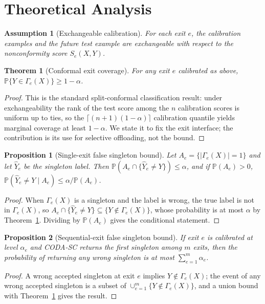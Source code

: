 \documentclass[11pt]{article}
\newtheorem{theorem}{Theorem}
\newtheorem{proposition}{Proposition}
\newtheorem{assumption}{Assumption}
\begin{document}
\section{Theoretical Analysis}

\begin{assumption}[Exchangeable calibration]
For each exit $e$, the calibration examples and the future test example are
exchangeable with respect to the nonconformity score $S_e(X,Y)$.
\end{assumption}

\begin{theorem}[Conformal exit coverage]
\label{thm:cov}
For any exit $e$ calibrated as above, $\mathbb{P}\{Y \in \Gamma_e(X)\} \geq 1-\alpha$.
\end{theorem}
\begin{proof}
This is the standard split-conformal classification result: under
exchangeability the rank of the test score among the $n$ calibration scores is
uniform up to ties, so the $\lceil(n+1)(1-\alpha)\rceil$ calibration quantile
yields marginal coverage at least $1-\alpha$. We state it to fix the exit
interface; the contribution is its use for selective offloading, not the bound.
\end{proof}

\begin{proposition}[Single-exit false singleton bound]
\label{prop:single}
Let $A_e=\{|\Gamma_e(X)|=1\}$ and let $\hat{Y}_e$ be the singleton label. Then
$\mathbb{P}(A_e \cap \{\hat{Y}_e \neq Y\}) \leq \alpha$, and if
$\mathbb{P}(A_e)>0$, $\mathbb{P}(\hat{Y}_e\neq Y \mid A_e) \leq \alpha/\mathbb{P}(A_e)$.
\end{proposition}
\begin{proof}
When $\Gamma_e(X)$ is a singleton and the label is wrong, the true label is not in
$\Gamma_e(X)$, so $A_e \cap \{\hat{Y}_e \neq Y\}\subseteq \{Y\notin\Gamma_e(X)\}$,
whose probability is at most $\alpha$ by Theorem~\ref{thm:cov}. Dividing by
$\mathbb{P}(A_e)$ gives the conditional statement.
\end{proof}

\begin{proposition}[Sequential-exit false singleton bound]
\label{prop:seq}
If exit $e$ is calibrated at level $\alpha_e$ and CODA-SC returns the first
singleton among $m$ exits, then the probability of returning any wrong singleton
is at most $\sum_{e=1}^{m}\alpha_e$.
\end{proposition}
\begin{proof}
A wrong accepted singleton at exit $e$ implies $Y\notin\Gamma_e(X)$; the event of
any wrong accepted singleton is a subset of $\cup_{e=1}^{m}\{Y\notin\Gamma_e(X)\}$,
and a union bound with Theorem~\ref{thm:cov} gives the result.
\end{proof}
\end{document}
